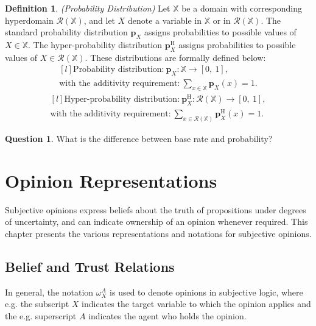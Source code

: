 \documentclass[a4paper,12pt]{article}
\theoremstyle{definition}
\newtheorem{question}{Question}[section]
\newtheorem{definition}{Definition}[section]
\numberwithin{equation}{section}
\begin{document}
\begin{definition}
	\emph{(Probability Distribution)} Let $\mathbb{X}$ be a domain with corresponding
hyperdomain $\mathcal{R}(\mathbb{X})$, and let $X$ denote a variable in $\mathbb{X}$ or in $\mathcal{R}(\mathbb{X})$. The standard probability distribution $\mathbf{p}_X$ assigns probabilities to possible values of $X \in \mathbb{X}$. The hyper-probability distribution $\mathbf{p}_X^\mathrm{H}$ assigns probabilities to possible values of $X \in \mathcal{R}(\mathbb{X})$. These distributions are formally defined below:
	\begin{equation}
		\begin{matrix*}[l]
			\text{Probability distribution:}\ \mathbf{p}_X : \mathbb{X} \rightarrow [0,\ 1], \\
			\text{with the additivity requirement:}\ \sum_{x \in \mathbb{X}} \mathbf{p}_X(x) = 1\text{.}
		\end{matrix*}
	\end{equation}
	\begin{equation}
		\begin{matrix*}[l]
			\text{Hyper-probability distribution:}\ \mathbf{p}_X^\mathrm{H} : \mathcal{R}(\mathbb{X}) \rightarrow [0,\ 1], \\
			\text{with the additivity requirement:}\ \sum_{x \in \mathcal{R}(\mathbb{X})} \mathbf{p}_X^\mathrm{H}(x) = 1\text{.}
		\end{matrix*}
	\end{equation}
\end{definition}

\begin{question}
	What is the difference between base rate and probability?
\end{question}

\section{Opinion Representations}

Subjective opinions express beliefs about the truth of propositions under degrees
of uncertainty, and can indicate ownership of an opinion whenever required. This
chapter presents the various representations and notations for subjective opinions.

\subsection{Belief and Trust Relations}

In general, the notation $\omega^A_ X$ is used to denote opinions in subjective logic, where e.g. the subscript $X$ indicates the target variable to which the opinion applies and the e.g. superscript $A$ indicates the agent who holds the opinion.
\end{document}
